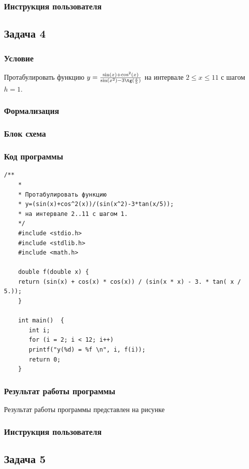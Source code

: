 \documentclass[simple,14pt]{eskdtext}
\begin{document}
	\subsubsection{Инструкция пользователя}
	
	\subsection{Задача 4}
	\subsubsection{Условие}
	Протабулировать функцию $ y=\frac{\sin(x)+\cos^2(x)}{\sin(x^2)-3\tg(\frac{x}{5})} $ на интервале $ 2\leq x\leq11 $ с шагом $h=1$.
	\subsubsection{Формализация}
	
	\subsubsection{Блок схема}
	\subsubsection{Код программы}
	\begin{lstlisting}[label=some-code3,caption=Задача 4]
	/**
	*
	* Протабулировать функцию
	* y=(sin(x)+cos^2(x))/(sin(x^2)-3*tan(x/5));
	* на интервале 2..11 с шагом 1.
	*/
	#include <stdio.h>
	#include <stdlib.h>
	#include <math.h>
	
	double f(double x) {
	return (sin(x) + cos(x) * cos(x)) / (sin(x * x) - 3. * tan( x / 5.));
	}
	
	int main()	{
	   int i;
	   for (i = 2; i < 12; i++)
	   printf("y(%d) = %f \n", i, f(i));
	   return 0;
	}
	\end{lstlisting}
	\subsubsection{Результат работы программы}
	Результат работы программы представлен на рисунке 
	\subsubsection{Инструкция пользователя}
	
	\subsection{Задача 5}
\end{document}
